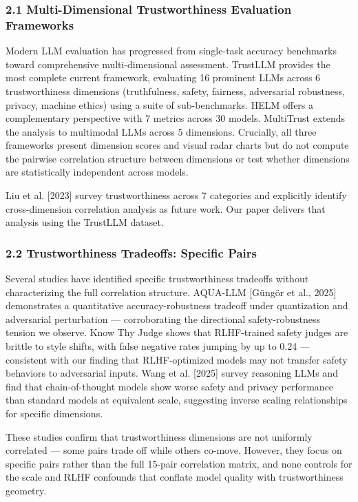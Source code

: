 
\subsubsection{2.1 Multi-Dimensional Trustworthiness Evaluation Frameworks}

Modern LLM evaluation has progressed from single-task accuracy benchmarks toward comprehensive multi-dimensional assessment. TrustLLM \citep{Sun2024TrustLLM} provides the most complete current framework, evaluating 16 prominent LLMs across 6 trustworthiness dimensions (truthfulness, safety, fairness, adversarial robustness, privacy, machine ethics) using a suite of sub-benchmarks. HELM \citep{Liang2022} offers a complementary perspective with 7 metrics across 30 models. MultiTrust \citep{Zhang2024MultiTrust} extends the analysis to multimodal LLMs across 5 dimensions. Crucially, all three frameworks present dimension scores and visual radar charts but do not compute the pairwise correlation structure between dimensions or test whether dimensions are statistically independent across models.

Liu et al. [2023] survey trustworthiness across 7 categories and explicitly identify cross-dimension correlation analysis as future work. Our paper delivers that analysis using the TrustLLM dataset.

\subsubsection{2.2 Trustworthiness Tradeoffs: Specific Pairs}

Several studies have identified specific trustworthiness tradeoffs without characterizing the full correlation structure. AQUA-LLM [Güngör et al., 2025] demonstrates a quantitative accuracy-robustness tradeoff under quantization and adversarial perturbation --- corroborating the directional safety-robustness tension we observe. Know Thy Judge \citep{Eiras2025KnowThyJudge} shows that RLHF-trained safety judges are brittle to style shifts, with false negative rates jumping by up to 0.24 --- consistent with our finding that RLHF-optimized models may not transfer safety behaviors to adversarial inputs. Wang et al. [2025] survey reasoning LLMs and find that chain-of-thought models show worse safety and privacy performance than standard models at equivalent scale, suggesting inverse scaling relationships for specific dimensions.

These studies confirm that trustworthiness dimensions are not uniformly correlated --- some pairs trade off while others co-move. However, they focus on specific pairs rather than the full 15-pair correlation matrix, and none controls for the scale and RLHF confounds that conflate model quality with trustworthiness geometry.

